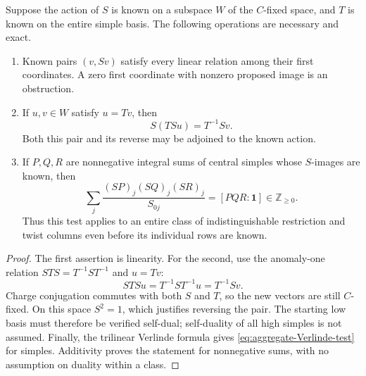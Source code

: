 \begin{proposition}
\label{prop:modular-word-closure}
Suppose the action of $S$ is known on a subspace $W$ of the $C$-fixed
space, and $T$ is known on the entire simple basis. The following operations
are necessary and exact.
\begin{enumerate}
\item Known pairs $(v,Sv)$ satisfy every linear relation among their first
coordinates. A zero first coordinate with nonzero proposed image is an
obstruction.
\item If $u,v\in W$ satisfy $u=Tv$, then
\[
 S(TSu)=T^{-1}Sv.
\]
Both this pair and its reverse may be adjoined to the known action.
\item If $P,Q,R$ are nonnegative integral sums of central simples whose
$S$-images are known, then
\begin{equation}\label{eq:aggregate-Verlinde-test}
 \sum_j\frac{(SP)_j(SQ)_j(SR)_j}{S_{0j}}
 =[PQR:\mathbf1]\in\mathbb Z_{\ge0}.
\end{equation}
Thus this test applies to an entire class of indistinguishable restriction
and twist columns even before its individual rows are known.
\end{enumerate}
\end{proposition}
\begin{proof}
The first assertion is linearity. For the second, use the anomaly-one
relation $STS=T^{-1}ST^{-1}$ and $u=Tv$:
\[
 STSu=T^{-1}ST^{-1}u=T^{-1}Sv.
\]
Charge conjugation commutes with both $S$ and $T$, so the new vectors are
still $C$-fixed. On this space $S^2=1$, which justifies reversing the pair.
The starting low basis must therefore be verified self-dual; self-duality
of all high simples is not assumed. Finally, the trilinear Verlinde formula
gives \eqref{eq:aggregate-Verlinde-test} for simples. Additivity proves the
statement for nonnegative sums, with no assumption on duality within a
class.
\end{proof}

